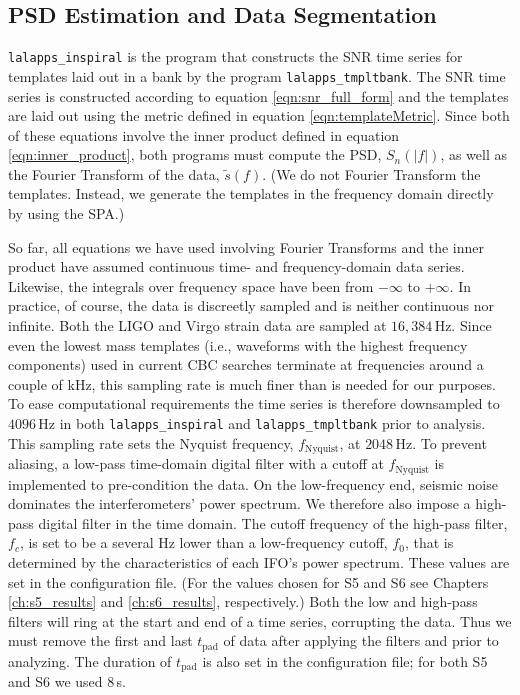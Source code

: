 \subsection{PSD Estimation and Data Segmentation}

\texttt{lalapps\_inspiral} is the program that constructs the \ac{SNR} time series for templates laid out in a bank by the program \texttt{lalapps\_tmpltbank}. The \ac{SNR} time series is constructed according to equation \ref{eqn:snr_full_form} and the templates are laid out using the metric defined in equation \ref{eqn:templateMetric}. Since both of these equations involve the inner product defined in equation \ref{eqn:inner_product}, both programs must compute the \ac{PSD}, $S_n(|f|)$, as well as the Fourier Transform of the data, $\widetilde{s}(f)$. (We do not Fourier Transform the templates. Instead, we generate the templates in the frequency domain directly by using the \ac{SPA}.)

So far, all equations we have used involving Fourier Transforms and the inner product have assumed continuous time- and frequency-domain data series. Likewise, the integrals over frequency space have been from $-\infty$ to $+\infty$. In practice, of course, the data is discreetly sampled and is neither continuous nor infinite. Both the \ac{LIGO} and Virgo strain data are sampled at $16,384\,\mathrm{Hz}$. Since even the lowest mass templates (i.e., waveforms with the highest frequency components) used in current \ac{CBC} searches terminate at frequencies around a couple of kHz, this sampling rate is much finer than is needed for our purposes. To ease computational requirements the time series is therefore downsampled to $4096\,\mathrm{Hz}$ in both \texttt{lalapps\_inspiral} and \texttt{lalapps\_tmpltbank} prior to analysis. This sampling rate sets the Nyquist frequency, $f_{\mathrm{Nyquist}}$, at $2048\,\mathrm{Hz}$. To prevent aliasing, a low-pass time-domain digital filter with a cutoff at $f_{\mathrm{Nyquist}}$ is implemented to pre-condition the data. On the low-frequency end, seismic noise dominates the interferometers' power spectrum. We therefore also impose a high-pass digital filter in the time domain. The cutoff frequency of the high-pass filter, $f_c$, is set to be a several Hz lower than a low-frequency cutoff, $f_0$, that is determined by the characteristics of each \ac{IFO}'s power spectrum. These values are set in the configuration file. (For the values chosen for \ac{S5} and \ac{S6} see Chapters \ref{ch:s5_results} and \ref{ch:s6_results}, respectively.) Both the low and high-pass filters will ring at the start and end of a time series, corrupting the data. Thus we must remove the first and last $t_{\mathrm{pad}}$ of data after applying the filters and prior to analyzing. The duration of $t_{\mathrm{pad}}$ is also set in the configuration file; for both \ac{S5} and \ac{S6} we used $8\,$s.

